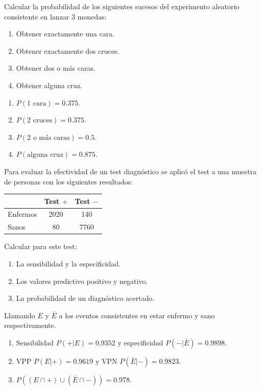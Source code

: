 {Calcular la probabilidad de los siguientes sucesos del experimento aleatorio consistente en lanzar 3 monedas:
\begin{enumerate}
\item Obtener exactamente una cara.  
\item Obtener exactamente dos cruces.
\item Obtener dos o más caras.
\item Obtener alguna cruz. 
\end{enumerate}
}
{
\begin{enumerate}
\item $P(\mbox{1 cara})=0.375$. 
\item $P(\mbox{2 cruces})=0.375$. 
\item $P(\mbox{2 o más caras})=0.5$. 
\item $P(\mbox{alguna cruz})=0.875$.
\end{enumerate}
}
{}


{Para evaluar la efectividad de un test diagnóstico se aplicó el test a una muestra de personas con los siguientes resultados:
\begin{center}
\begin{tabular}{|l|c|c|}
\cline{2-3}
\multicolumn{1}{l|}{} & Test $+$ & Test $-$ \\
\hline
Enfermos & 2020 & 140 \\
\hline
Sanos & 80 & 7760 \\
\hline
\end{tabular}
\end{center}

Calcular para este test:
\begin{enumerate}
\item La sensibilidad y la especificidad.
\item Los valores predictivo positivo y negativo.
\item La probabilidad de un diagnóstico acertado. 
\end{enumerate}
}
{Llamando $E$ y $\bar E$ a los eventos consistentes en estar enfermo y sano respectivamente. 
\begin{enumerate}
\item Sensibilidad $P(+|E)=0.9352$ y especificidad $P(-|\bar E)=0.9898$. 
\item VPP $P(E|+)=0.9619$ y VPN $P(\bar E|-)=0.9823$.
\item $P((E\cap +)\cup (\bar E\cap -))= 0.978$.
\end{enumerate}
}
{}


